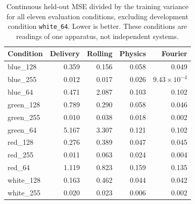 \begin{table}[ht]
\centering\small
\begin{tabular}{lrrrr}
\toprule
Condition & Delivery & Rolling & Physics & Fourier\\
\midrule
blue\_128 & 0.359 & 0.156 & 0.058 & 0.049\\
blue\_255 & 0.012 & 0.017 & 0.026 & $9.43\times10^{-4}$\\
blue\_64 & 0.471 & 2.087 & 0.103 & 0.102\\
green\_128 & 0.789 & 0.290 & 0.058 & 0.046\\
green\_255 & 0.010 & 0.038 & 0.018 & 0.002\\
green\_64 & 5.167 & 3.307 & 0.121 & 0.102\\
red\_128 & 0.276 & 0.389 & 0.047 & 0.045\\
red\_255 & 0.011 & 0.063 & 0.024 & 0.004\\
red\_64 & 1.119 & 0.823 & 0.159 & 0.135\\
white\_128 & 0.163 & 0.462 & 0.044 & 0.042\\
white\_255 & 0.020 & 0.023 & 0.006 & 0.002\\
\bottomrule
\end{tabular}
\caption{Continuous held-out MSE divided by the training variance for all eleven evaluation conditions, excluding development condition \texttt{white\_64}. Lower is better. These conditions are readings of one apparatus, not independent systems.}
\label{tab:physical}
\end{table}
